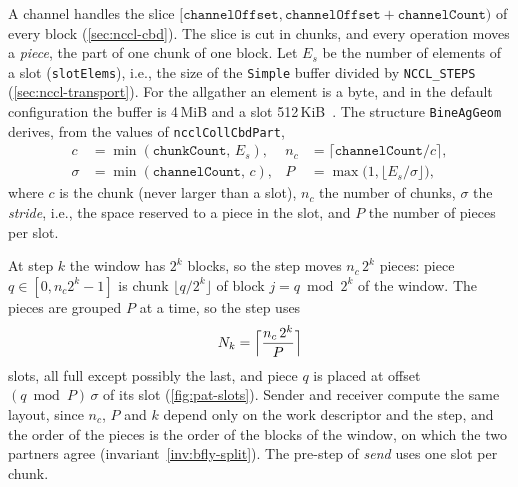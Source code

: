 A channel handles the slice $[\texttt{channelOffset},\texttt{channelOffset}+\texttt{channelCount})$ of every block (\cref{sec:nccl-cbd}).
The slice is cut in chunks, and every operation moves a \emph{piece}, the part of one chunk of one block.
Let $E_s$ be the number of elements of a slot (\texttt{slotElems}), i.e., the size of the \texttt{Simple} buffer divided by \texttt{NCCL\_STEPS} (\cref{sec:nccl-transport}).
For the allgather an element is a byte, and in the default configuration the buffer is 4\,MiB and a slot 512\,KiB~\cite{hu2025demystifying}.
The structure \texttt{BineAgGeom} derives, from the values of \texttt{ncclCollCbdPart},
\begin{align}
  c &= \min(\texttt{chunkCount},\,E_s), & n_c &= \lceil \texttt{channelCount}/c\rceil,\\
  \sigma &= \min(\texttt{channelCount},\,c), & P &= \max\bigl(1,\lfloor E_s/\sigma\rfloor\bigr),
\end{align}
where $c$ is the chunk (never larger than a slot), $n_c$ the number of chunks, $\sigma$ the \emph{stride}, i.e., the space reserved to a piece in the slot, and $P$ the number of pieces per slot.

At step $k$ the window has $2^k$ blocks, so the step moves $n_c\,2^k$ pieces: piece $q\in[0,n_c2^k-1]$ is chunk $\lfloor q/2^k\rfloor$ of block $j=q\bmod 2^k$ of the window.
The pieces are grouped $P$ at a time, so the step uses
\begin{equation}
  N_k=\Bigl\lceil \frac{n_c\,2^k}{P}\Bigr\rceil
  \label{eq:pat-slots}
\end{equation}
slots, all full except possibly the last, and piece $q$ is placed at offset $(q\bmod P)\,\sigma$ of its slot (\cref{fig:pat-slots}).
Sender and receiver compute the same layout, since $n_c$, $P$ and $k$ depend only on the work descriptor and the step, and the order of the pieces is the order of the blocks of the window, on which the two partners agree (invariant~\ref{inv:bfly-split}).
The pre-step of \emph{send} uses one slot per chunk.

